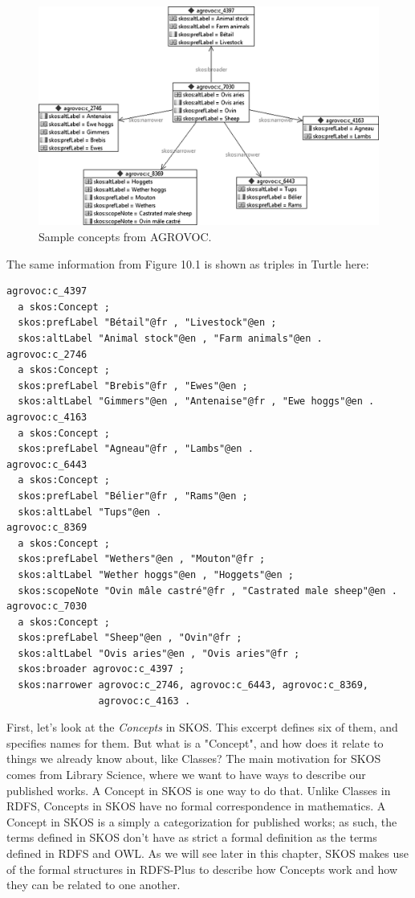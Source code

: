\begin{figure}
\centering
\includegraphics[width=5in]{media/ch11/f11-01.png}
\caption{Sample concepts from AGROVOC.}
\label{fig:ch11.1}
\end{figure}


The same information from Figure 10.1 is shown as triples in Turtle
here:

\begin{lstlisting}
agrovoc:c_4397
  a skos:Concept ;
  skos:prefLabel "Bétail"@fr , "Livestock"@en ;
  skos:altLabel "Animal stock"@en , "Farm animals"@en .
agrovoc:c_2746
  a skos:Concept ;
  skos:prefLabel "Brebis"@fr , "Ewes"@en ;
  skos:altLabel "Gimmers"@en , "Antenaise"@fr , "Ewe hoggs"@en .
agrovoc:c_4163
  a skos:Concept ;
  skos:prefLabel "Agneau"@fr , "Lambs"@en .
agrovoc:c_6443
  a skos:Concept ;
  skos:prefLabel "Bélier"@fr , "Rams"@en ;
  skos:altLabel "Tups"@en .
agrovoc:c_8369
  a skos:Concept ;
  skos:prefLabel "Wethers"@en , "Mouton"@fr ;
  skos:altLabel "Wether hoggs"@en , "Hoggets"@en ;
  skos:scopeNote "Ovin mâle castré"@fr , "Castrated male sheep"@en .
agrovoc:c_7030
  a skos:Concept ;
  skos:prefLabel "Sheep"@en , "Ovin"@fr ;
  skos:altLabel "Ovis aries"@en , "Ovis aries"@fr ;
  skos:broader agrovoc:c_4397 ;
  skos:narrower agrovoc:c_2746, agrovoc:c_6443, agrovoc:c_8369,
                agrovoc:c_4163 .
\end{lstlisting}

First, let's look at the \textit{Concepts} in SKOS. This excerpt defines six of them, and specifies
names for them.  But what is a "Concept", and how does it relate to things we already know about, 
like Classes?  The main motivation for SKOS comes from Library Science, where we want to have ways to describe our 
published works.  A Concept in SKOS is one way to do that.  Unlike Classes in RDFS, Concepts in SKOS have no formal correspondence in mathematics. A Concept in SKOS is a simply a categorization for published works; as such, the terms defined in SKOS don't have as strict a formal definition as the terms defined in RDFS and OWL.  As we will see later in this chapter, SKOS makes use of the formal structures in RDFS-Plus to describe how Concepts work and how they can be related to one another. 

